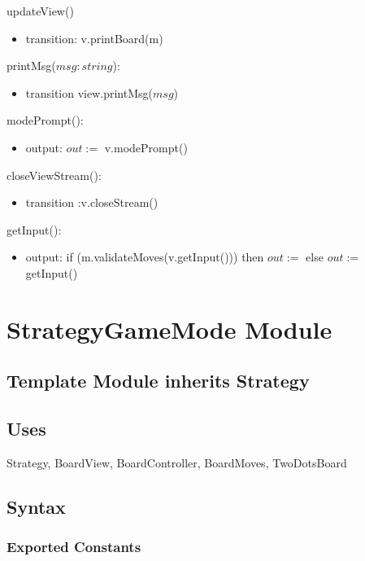\documentclass[12pt]{article}
\begin{document}
\noindent updateView()
\begin{itemize}
\item transition: v.printBoard(m)
\end{itemize}

\noindent printMsg($msg : string$): 
\begin{itemize}
\item transition view.printMsg($msg$)
\end{itemize}


\noindent modePrompt(): 
\begin{itemize}
\item output: $out := $ v.modePrompt()
\end{itemize}

\noindent closeViewStream(): 
\begin{itemize}
\item transition :v.closeStream()
\end{itemize}


\noindent getInput(): 
\begin{itemize}
\item output: if (m.validateMoves(v.getInput())) then $out:=$ else $out :=$ getInput()
\end{itemize}


\newpage

\section* {StrategyGameMode Module}

\subsection* {Template Module inherits Strategy}


\subsection{Uses}
Strategy, BoardView, BoardController, BoardMoves, TwoDotsBoard

\subsection* {Syntax}

\subsubsection* {Exported Constants}
\end{document}
